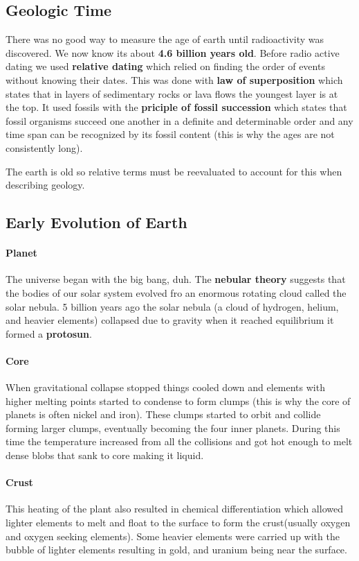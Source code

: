 \documentclass{article}
\begin{document}
\subsection{Geologic Time} %
\label{sub:geologic_time}
There was no good way to measure the age of earth until radioactivity was discovered. We now know its about \textbf{4.6 billion years old}. Before radio active dating we used \textbf{relative dating} which relied on finding the order of events without knowing their dates. This was done with \textbf{law of superposition} which states that in layers of sedimentary rocks or lava flows the youngest layer is at the top. It used fossils with the \textbf{priciple of fossil succession} which states that fossil organisms succeed one another in a definite and determinable order and any time span can be recognized by its fossil content (this is why the ages are not consistently long).

The earth is old so relative terms must be reevaluated to account for this when describing geology.

\subsection{Early Evolution of Earth} %
\label{sub:early_evolution_of_earth}
 \paragraph{Planet}The universe began with the big bang, duh. The \textbf{nebular theory} suggests that the bodies of our solar system evolved fro an enormous rotating cloud called the solar nebula. 5 billion years ago the solar nebula (a cloud of hydrogen, helium, and heavier elements) collapsed due to gravity when it reached equilibrium it formed a \textbf{protosun}.

 \paragraph{Core} When gravitational collapse stopped things cooled down and elements with higher melting points started to condense to form clumps (this is why the core of planets is often nickel and iron). These clumps started to orbit and collide forming larger clumps, eventually becoming the four inner planets. During this time the temperature increased from all the collisions and got hot enough to melt dense blobs that sank to core making it liquid.

 \paragraph{Crust} This heating of the plant also resulted in chemical differentiation which allowed lighter elements to melt and float to the surface to form the crust(usually oxygen and oxygen seeking elements). Some heavier elements were carried up with the bubble of lighter elements resulting in gold, and uranium being near the surface.
\end{document}
